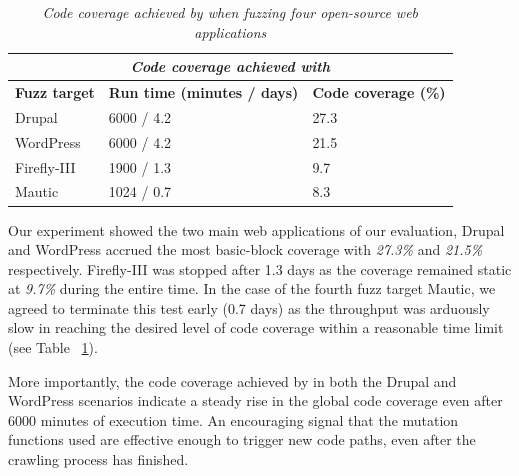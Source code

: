 \begin{table}[h]
\centering
 \begin{tabular}{@{}|l|l|l|@{}}
 \hline
 \multicolumn{3}{|c|}{\textit{\textbf{Code coverage achieved with \pname{} }}} \\
 \hline
 \textbf{Fuzz target} & \textbf{Run time (minutes / days)} & \textbf{Code coverage (\%)} \\ 
 \hline\hline
 Drupal & 6000 / 4.2 & 27.3 \\ 
 \hline
 WordPress & 6000 / 4.2 & 21.5 \\ 
 \hline
 Firefly-III & 1900 / 1.3 & 9.7 \\ 
 \hline
 Mautic & 1024 / 0.7 & 8.3 \\ 
 \hline
 \end{tabular}
 \captionsetup{justification=centering}
 \caption[Code coverage achieved by \pname{}]{\textit{Code coverage achieved by \pname{} when fuzzing four open-source web applications}}

 \label{coverage_table}
\end{table}

Our experiment showed the two main web applications of our evaluation, Drupal and WordPress accrued the most basic-block coverage with \emph{27.3\%} and \emph{21.5\%} respectively. Firefly-III was stopped after 1.3 days as the coverage remained static at \emph{9.7\%} during the entire time. In the case of the fourth fuzz target Mautic, we agreed to terminate this test early (0.7 days) as the throughput was arduously slow in reaching the desired level of code coverage within a reasonable time limit (see Table ~\ref{coverage_table}). 

More importantly, the code coverage achieved by \pname{} in both the Drupal and WordPress scenarios indicate a steady rise in the global code coverage even after 6000 minutes of execution time. An encouraging signal that the mutation functions used are effective enough to trigger new code paths, even after the crawling process has finished. 
 
